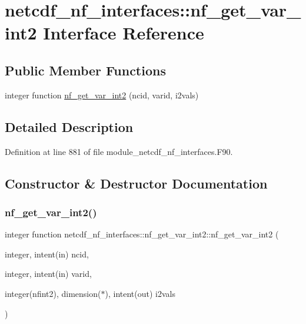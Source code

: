 \hypertarget{interfacenetcdf__nf__interfaces_1_1nf__get__var__int2}{}\section{netcdf\+\_\+nf\+\_\+interfaces\+:\+:nf\+\_\+get\+\_\+var\+\_\+int2 Interface Reference}
\label{interfacenetcdf__nf__interfaces_1_1nf__get__var__int2}
\subsection*{Public Member Functions}
\begin{DoxyCompactItemize}
\item 
integer function \hyperlink{interfacenetcdf__nf__interfaces_1_1nf__get__var__int2_af280ce4bc301fbf17bb9c0a0d85b651f}{nf\+\_\+get\+\_\+var\+\_\+int2} (ncid, varid, i2vals)
\end{DoxyCompactItemize}


\subsection{Detailed Description}


Definition at line 881 of file module\+\_\+netcdf\+\_\+nf\+\_\+interfaces.\+F90.



\subsection{Constructor \& Destructor Documentation}
\mbox{\label{interfacenetcdf__nf__interfaces_1_1nf__get__var__int2_af280ce4bc301fbf17bb9c0a0d85b651f}} 
\subsubsection{\texorpdfstring{nf\+\_\+get\+\_\+var\+\_\+int2()}{nf\_get\_var\_int2()}}
{\footnotesize\ttfamily integer function netcdf\+\_\+nf\+\_\+interfaces\+::nf\+\_\+get\+\_\+var\+\_\+int2\+::nf\+\_\+get\+\_\+var\+\_\+int2 (\begin{DoxyParamCaption}\item[{integer, intent(in)}]{ncid,  }\item[{integer, intent(in)}]{varid,  }\item[{integer(nfint2), dimension($\ast$), intent(out)}]{i2vals }\end{DoxyParamCaption})}



